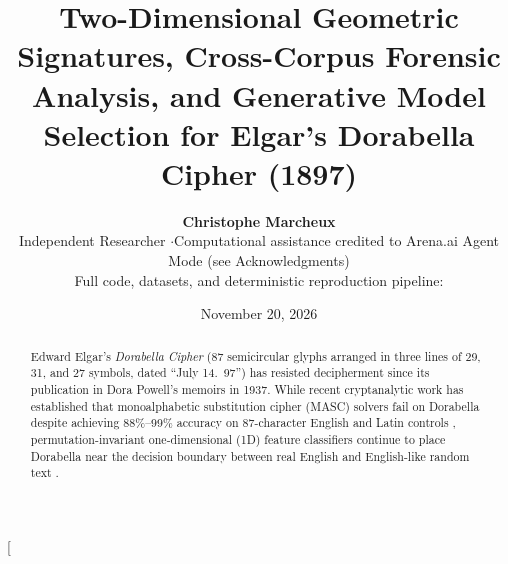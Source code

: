 \documentclass[10pt,a4paper,twocolumn]{article}
\title{\vspace{-1.0cm}\LARGE\bfseries\color{navy} Two-Dimensional Geometric Signatures, Cross-Corpus Forensic Analysis, and Generative Model Selection for Elgar's Dorabella Cipher (1897)}
\author{%
  \textbf{Christophe Marcheux} \\[2pt]
  \small\color{slate} Independent Researcher \quad$\cdot$\quad Computational assistance credited to Arena.ai Agent Mode (see Acknowledgments) \\
  \small\color{slate} Full code, datasets, and deterministic reproduction pipeline: \code{scripts/reproduce\_all.py}
}
\date{\small November 20, 2026}
\begin{document}
\twocolumn[
\begin{@twocolumnfalse}
\maketitle
\thispagestyle{plain}
\vspace{-0.4cm}
\begin{abstract}
\noindent
Edward Elgar's \emph{Dorabella Cipher} (87 semicircular glyphs arranged in three lines of 29, 31, and 27 symbols, dated ``July 14.~97'') has resisted decipherment since its publication in Dora Powell's memoirs in 1937. While recent cryptanalytic work has established that monoalphabetic substitution cipher (MASC) solvers fail on Dorabella despite achieving 88\%--99\% accuracy on 87-character English and Latin controls \citep{hauer2021dorabella,wase2025dorabella}, permutation-invariant one-dimensional (1D) feature classifiers continue to place Dorabella near the decision boundary between real English and English-like random text \citep{foxon2024ann,foxon2025ml}.


\end{abstract}
\end{@twocolumnfalse}
\end{document}
